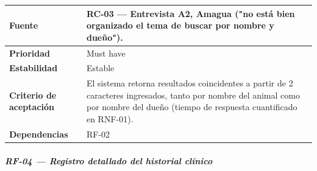 {\def\LTcaptype{none} %
\begin{longtable}[]{@{}
  >{\raggedright\arraybackslash}p{}
  >{\raggedright\arraybackslash}p{}@{}}
\toprule\noalign{}
\begin{minipage}[b]{\linewidth}\raggedright
\textbf{Fuente}
\end{minipage} & \begin{minipage}[b]{\linewidth}\raggedright
RC-03 --- Entrevista A2, Amagua ("no está bien organizado el tema de
buscar por nombre y dueño").
\end{minipage} \\
\midrule\noalign{}
\endhead
\bottomrule\noalign{}
\endlastfoot
\textbf{Prioridad} & \begin{minipage}[t]{\linewidth}\raggedright
Must have
\end{minipage} \\
\textbf{Estabilidad} & \begin{minipage}[t]{\linewidth}\raggedright
Estable
\end{minipage} \\
\textbf{Criterio de aceptación} &
\begin{minipage}[t]{\linewidth}\raggedright
El sistema retorna resultados coincidentes a partir de 2 caracteres
ingresados, tanto por nombre del animal como por nombre del dueño
(tiempo de respuesta cuantificado en RNF-01).
\end{minipage} \\
\textbf{Dependencias} & \begin{minipage}[t]{\linewidth}\raggedright
RF-02
\end{minipage} \\
\end{longtable}
}

\subparagraph{RF-04 --- Registro detallado del historial
clínico}\label{rf-04-registro-detallado-del-historial-cluxednico}


